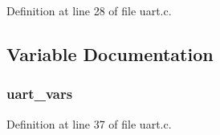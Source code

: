 Definition at line 28 of file uart.\+c.



\subsection{Variable Documentation}
\subsubsection[{\texorpdfstring{uart\+\_\+vars}{uart_vars}}]{ uart\+\_\+vars}\hypertarget{_open_mote-_c_c2538_2uart_8c_a7ad63ce38b958040884df8d8ca5da620}{}\label{_open_mote-_c_c2538_2uart_8c_a7ad63ce38b958040884df8d8ca5da620}


Definition at line 37 of file uart.\+c.

